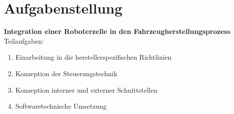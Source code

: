 \section{Aufgabenstellung}

\textbf{Integration einer Roboterzelle in den Fahrzeugherstellungsprozess}\leer
Teilaufgaben:%
\begin{enumerate}
	\item Einarbeitung in die herstellerspezifischen Richtlinien
	\item Konzeption der Steuerungstechnik
	\item Konzeption interner und externer Schnittstellen
	\item Softwaretechnische Umsetzung
\end{enumerate}

